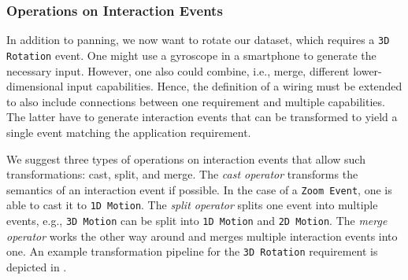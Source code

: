 \documentclass[twoside,twocolumn,10pt]{article}
\begin{document}
\subsubsection{Operations on Interaction Events}





In addition to panning, we now want to rotate our dataset, which requires a \texttt{3D Rotation} event. One might use a gyroscope in a smartphone to generate the necessary input. However, one also could combine, i.e., merge, different lower-dimensional input capabilities.
Hence, the definition of a wiring must be extended to also include connections between one requirement and multiple capabilities. The latter have to generate interaction events that can be transformed to yield a single event matching the application requirement.



We suggest three types of operations on interaction events that allow such transformations: cast, split, and merge. The \emph{cast operator} transforms the semantics of an interaction event if possible. In the case of a \texttt{Zoom Event}, one is able to cast it to \texttt{1D Motion}. The \emph{split operator} splits one event into multiple events, e.g., \texttt{3D Motion} can be split into \texttt{1D Motion} and \texttt{2D Motion}. The \emph{merge operator} works the other way around and merges multiple interaction events into one. An example transformation pipeline for the \texttt{3D Rotation} requirement is depicted in .

\end{document}
